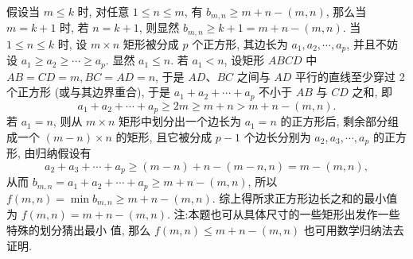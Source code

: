 假设当 $m \leqslant k$ 时, 对任意 $1 \leqslant n \leqslant m$, 有 $b_{m, n} \geqslant m+n-(m, n)$, 那么当 $m=k+1$ 时, 若 $n=k+1$, 则显然 $b_{m, n} \geqslant k+1=m+n-(m, n)$. 当 $1 \leqslant n \leqslant k$ 时, 设 $m \times n$ 矩形被分成 $p$ 个正方形, 其边长为 $a_1, a_2, \cdots, a_p$, 并且不妨设 $a_1 \geqslant a_2 \geqslant \cdots \geqslant a_p$. 显然 $a_1 \leqslant n$. 若 $a_1<n$, 设矩形 $A B C D$ 中 $A B= C D=m, B C=A D=n$, 于是 $A D 、 B C$ 之间与 $A D$ 平行的直线至少穿过 2 个正方形 (或与其边界重合), 于是 $a_1+a_2+\cdots+a_p$ 不小于 $A B$ 与 $C D$ 之和, 即
$$
a_1+a_2+\cdots+a_p \geqslant 2 m \geqslant m+n>m+n-(m, n) .
$$
若 $a_1=n$, 则从 $m \times n$ 矩形中划分出一个边长为 $a_1=n$ 的正方形后, 剩余部分组成一个 $(m-n) \times n$ 的矩形, 且它被分成 $p-1$ 个边长分别为 $a_2, a_3, \cdots, a_p$ 的正方形, 由归纳假设有
$$
a_2+a_3+\cdots+a_p \geqslant(m-n)+n-(m-n, n)=m-(m, n),
$$
从而 $b_{m, n}=a_1+a_2+\cdots+a_p \geqslant m+n-(m, n)$, 所以 $f(m, n)=\min b_{m, n} \geqslant m+n-(m, n)$.
综上得所求正方形边长之和的最小值为 $f(m, n)=m+n-(m, n)$.
注:本题也可从具体尺寸的一些矩形出发作一些特殊的划分猜出最小 值, 那么 $f(m, n) \leqslant m+n-(m, n)$ 也可用数学归纳法去证明.




